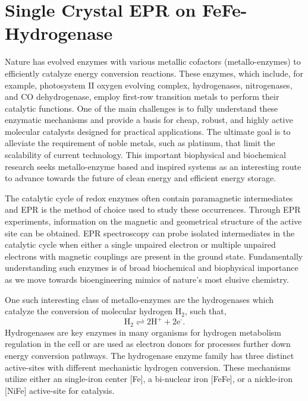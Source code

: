 \chapter[Single-Crystal EPR on FeFe-Hydrogenase]{Single Crystal EPR on FeFe-Hydrogenase}

Nature has evolved enzymes with various metallic cofactors (metallo-enzymes) to efficiently catalyze energy conversion reactions. These enzymes, which include, for example, photosystem II oxygen evolving complex\cite{CoxOEC}, hydrogenases\cite{lubitzhyd}, nitrogenases\cite{Hoffman2014rev}, and CO dehydrogenase\cite{C5CS00182J}, employ first-row transition metals to perform their catalytic functions. One of the main challenges is to fully understand these enzymatic mechanisms and provide a basis for cheap, robust, and highly active molecular catalysts designed for practical applications. \cite{Lewis15729} The ultimate goal is to alleviate the requirement of noble metals, such as platinum, that limit the scalability of current technology. This important biophysical and biochemical research seeks metallo-enzyme based and inspired systems as an interesting route to advance towards the future of clean energy and efficient energy storage. \cite{schlogl2012chemical}

The catalytic cycle of redox enzymes often contain paramagnetic intermediates and EPR is the method of choice used to study these occurrences. Through EPR experiments, information on the magnetic and geometrical structure of the active site can be obtained. EPR spectroscopy can probe isolated intermediates in the catalytic cycle when either a single unpaired electron or multiple unpaired electrons with magnetic couplings are present in the ground state. Fundamentally understanding such enzymes is of broad biochemical and biophysical importance as we move towards bioengineering mimics of nature’s most elusive chemistry. \cite{WATANABE20171}

One such interesting class of metallo-enzymes are the hydrogenases which catalyze the conversion of molecular hydrogen H$_2$, such that,
\begin{equation}
    \text{H}_2 \rightleftharpoons 2 \text{H}^+ + 2\text{e}^{\text{-}}.
\end{equation}
Hydrogenases are key enzymes in many organisms for hydrogen metabolism regulation in the cell or are used as electron donors for processes further down energy conversion pathways. The hydrogenase enzyme family has three distinct active-sites with different mechanistic hydrogen conversion. These mechanisms utilize either an single-iron center [Fe], a bi-nuclear iron [FeFe], or a nickle-iron [NiFe] active-site for catalysis. \cite{LubitzNiFe2016, lubitzhyd} 

